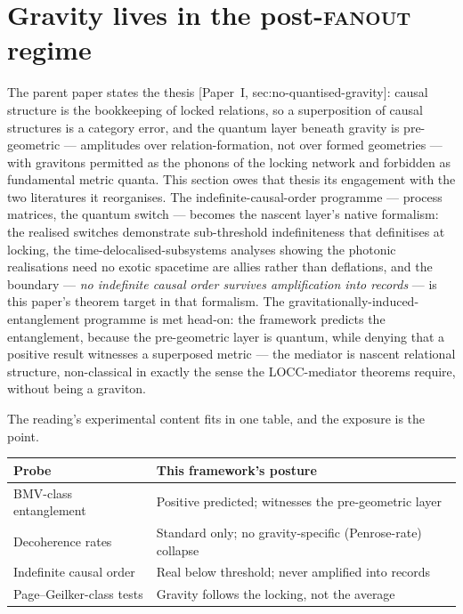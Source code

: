 \documentclass[11pt,a4paper]{article}
\newcommand{\Pone}[1]{[Paper~I, #1]} %
\newcommand{\fanout}{\textsc{fanout}}
\begin{document}
\section{Gravity lives in the post-\fanout{} regime}
\label{sec:p2-postfanout}

The parent paper states the thesis \Pone{sec:no-quantised-gravity}: causal structure is the
bookkeeping of locked relations, so a superposition of causal structures is a category error, and
the quantum layer beneath gravity is pre-geometric --- amplitudes over relation-formation, not
over formed geometries --- with gravitons permitted as the phonons of the locking network and
forbidden as fundamental metric quanta. This section owes that thesis its engagement with the two
literatures it reorganises. The indefinite-causal-order programme --- process matrices, the
quantum switch --- becomes the nascent layer's native formalism: the realised switches
\autocite{procopio2015experimental, rubino2017indefinite} demonstrate sub-threshold indefiniteness that definitises at
locking, the time-delocalised-subsystems analyses showing the photonic realisations need no exotic
spacetime are allies rather than deflations, and the boundary --- \emph{no indefinite causal order
survives amplification into records} --- is this paper's theorem target in that formalism.
The gravitationally-induced-entanglement programme
\autocite{bose2017spin, marlettovedral2017gravitationally} is met head-on: the framework predicts
the entanglement, because the pre-geometric layer is quantum, while denying that a positive result
witnesses a superposed metric --- the mediator is nascent relational structure, non-classical in
exactly the sense the LOCC-mediator theorems require, without being a graviton.

The reading's experimental content fits in one table, and the exposure is the point.

\begin{center}
\begin{tabular}{ll}
\hline
Probe & This framework's posture \\
\hline
BMV-class entanglement & Positive predicted; witnesses the pre-geometric layer \\
Decoherence rates & Standard only; no gravity-specific (Penrose-rate) collapse \\
Indefinite causal order & Real below threshold; never amplified into records \\
Page--Geilker-class tests & Gravity follows the locking, not the average \\
\hline
\end{tabular}
\end{center}
\end{document}
